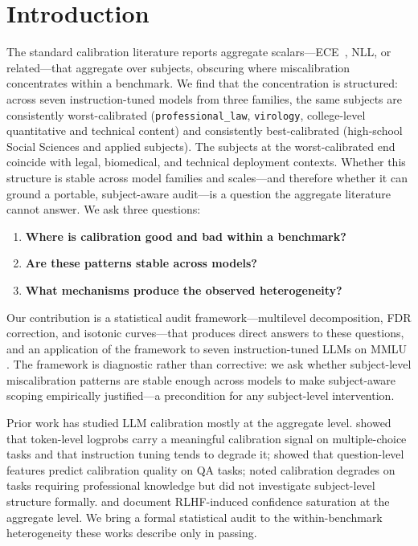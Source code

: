 \documentclass{article}
\begin{document}
\section{Introduction}

The standard calibration literature reports aggregate scalars---ECE~\citep{guo2017calibration}, NLL, or
related---that aggregate over subjects, obscuring where miscalibration concentrates within a benchmark.
We find that the concentration is structured: across seven instruction-tuned models from three families,
the same subjects are consistently worst-calibrated (\texttt{professional\_law}, \texttt{virology},
college-level quantitative and technical content) and consistently best-calibrated (high-school Social
Sciences and applied subjects). The subjects at the worst-calibrated end coincide with legal, biomedical,
and technical deployment contexts. Whether this structure is stable across model families and
scales---and therefore whether it can ground a portable, subject-aware audit---is a question the
aggregate literature cannot answer. We ask three questions:

\begin{enumerate}
  \item \textbf{Where is calibration good and bad within a benchmark?}
  \item \textbf{Are these patterns stable across models?}
  \item \textbf{What mechanisms produce the observed heterogeneity?}
\end{enumerate}

Our contribution is a statistical audit framework---multilevel decomposition,
FDR correction, and isotonic curves---that produces
direct answers to these questions, and an application of the framework to seven
instruction-tuned LLMs on MMLU \citep{hendrycks2021measuring}. The framework is
diagnostic rather than corrective: we ask whether subject-level miscalibration
patterns are stable enough across models to make subject-aware scoping
empirically justified---a precondition for any subject-level intervention.

Prior work has studied LLM calibration mostly at the aggregate level.
\citet{kadavath2022language} showed that token-level logprobs carry a meaningful
calibration signal on multiple-choice tasks and that instruction tuning tends to
degrade it; \citet{jiang2021can} showed that question-level features predict
calibration quality on QA tasks; \citet{xiong2024can} noted calibration degrades
on tasks requiring professional knowledge but did not investigate subject-level
structure formally.
\citet{nakkiran2025trained} and \citet{yaldiz2026balancing} document
RLHF-induced confidence saturation at the aggregate level. We bring a formal
statistical audit to the within-benchmark heterogeneity these works describe only
in passing.
\end{document}
